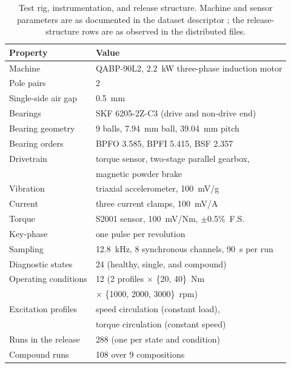 \begin{table}[!t]
\caption{Test rig, instrumentation, and release structure. Machine and sensor
parameters are as documented in the dataset descriptor \cite{chen2026}; the
release-structure rows are as observed in the distributed files.}
\label{tab:rig}
\centering
\footnotesize
\setlength{\tabcolsep}{4pt}
\begin{tabular}{l l}
\toprule
Property & Value \\
\midrule
Machine & QABP-90L2, 2.2~kW three-phase induction motor \\
Pole pairs & 2 \\
Single-side air gap & 0.5~mm \\
Bearings & SKF 6205-2Z-C3 (drive and non-drive end) \\
Bearing geometry & 9 balls, 7.94~mm ball, 39.04~mm pitch \\
Bearing orders & BPFO 3.585, BPFI 5.415, BSF 2.357 \\
Drivetrain & torque sensor, two-stage parallel gearbox, \\
           & magnetic powder brake \\
\midrule
Vibration & triaxial accelerometer, 100~mV/g \\
Current & three current clamps, 100~mV/A \\
Torque & S2001 sensor, 100~mV/Nm, $\pm$0.5\%~F.S. \\
Key-phase & one pulse per revolution \\
Sampling & 12.8~kHz, 8 synchronous channels, 90~s per run \\
\midrule
Diagnostic states & 24 (healthy, single, and compound) \\
Operating conditions & 12 (2 profiles $\times$ \{20, 40\}~Nm \\
                     & $\times$ \{1000, 2000, 3000\}~rpm) \\
Excitation profiles & speed circulation (constant load), \\
                    & torque circulation (constant speed) \\
Runs in the release & 288 (one per state and condition) \\
Compound runs & 108 over 9 compositions \\
\bottomrule
\end{tabular}
\end{table}


